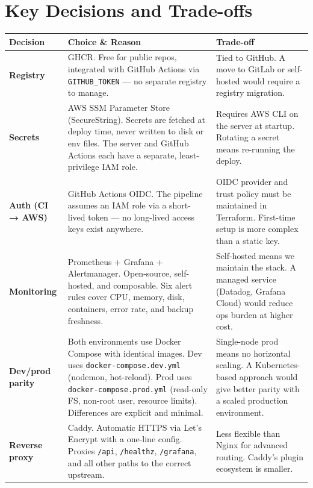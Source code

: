 \documentclass[11pt,a4paper]{article}
\begin{document}
\section{Key Decisions and Trade-offs}

\begin{tabularx}{\linewidth}{@{}lLL@{}}
\toprule
\textbf{Decision} & \textbf{Choice \& Reason} & \textbf{Trade-off} \\
\midrule
\textbf{Registry} &
  GHCR. Free for public repos, integrated with GitHub Actions via \texttt{GITHUB\_TOKEN} — no separate registry to manage. &
  Tied to GitHub. A move to GitLab or self-hosted would require a registry migration. \\
\addlinespace
\textbf{Secrets} &
  AWS SSM Parameter Store (SecureString). Secrets are fetched at deploy time, never written to disk or env files. The server and GitHub Actions each have a separate, least-privilege IAM role. &
  Requires AWS CLI on the server at startup. Rotating a secret means re-running the deploy. \\
\addlinespace
\textbf{Auth (CI → AWS)} &
  GitHub Actions OIDC. The pipeline assumes an IAM role via a short-lived token — no long-lived access keys exist anywhere. &
  OIDC provider and trust policy must be maintained in Terraform. First-time setup is more complex than a static key. \\
\addlinespace
\textbf{Monitoring} &
  Prometheus + Grafana + Alertmanager. Open-source, self-hosted, and composable. Six alert rules cover CPU, memory, disk, containers, error rate, and backup freshness. &
  Self-hosted means we maintain the stack. A managed service (Datadog, Grafana Cloud) would reduce ops burden at higher cost. \\
\addlinespace
\textbf{Dev/prod parity} &
  Both environments use Docker Compose with identical images. Dev uses \texttt{docker-compose.dev.yml} (nodemon, hot-reload). Prod uses \texttt{docker-compose.prod.yml} (read-only FS, non-root user, resource limits). Differences are explicit and minimal. &
  Single-node prod means no horizontal scaling. A Kubernetes-based approach would give better parity with a scaled production environment. \\
\addlinespace
\textbf{Reverse proxy} &
  Caddy. Automatic HTTPS via Let's Encrypt with a one-line config. Proxies \texttt{/api}, \texttt{/healthz}, \texttt{/grafana}, and all other paths to the correct upstream. &
  Less flexible than Nginx for advanced routing. Caddy's plugin ecosystem is smaller. \\
\bottomrule
\end{tabularx}
\end{document}

